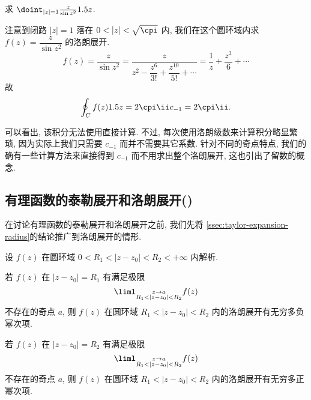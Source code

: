 \begin{example}
  求 $\doint_{|z|=1}\frac{z}{\sin z^2}\d z$.
\end{example}

\begin{solution}
  注意到闭路 $|z|=1$ 落在 $0<|z|<\sqrt \cpi$ 内, 我们在这个圆环域内求 $f(z)=\dfrac{z}{\sin z^2}$ 的洛朗展开.
  \[
     f(z)
    =\frac{z}{\sin z^2}
    =\frac{z}{z^2-\dfrac{z^6}{3!}+\dfrac{z^{10}}{5!}+\cdots}
    =\frac1z+\frac{z^3}6+\cdots
  \]
  故
  \[
    \oint_Cf(z)\d z=2\cpi\ii  c_{-1}=2\cpi\ii .
  \]
\end{solution}

可以看出, 该积分无法使用\thmCIH 直接计算.
不过, 每次使用洛朗级数来计算积分略显繁琐, 因为实际上我们只需要 $c_{-1}$ 而并不需要其它系数.
针对不同的奇点特点, 我们的确有一些计算方法来直接得到 $c_{-1}$ 而不用求出整个洛朗展开, 这也引出了留数的概念.


\subsection{有理函数的泰勒展开和洛朗展开(\optional)}
\label{ssec:rational-function-expansion}

在讨论有理函数的泰勒展开和洛朗展开之前, 我们先将 \ref{ssec:taylor-expansion-radius}的结论推广到洛朗展开的情形.

\begin{theorem}
  设 $f(z)$ 在圆环域 $0<R_1<|z-z_0|<R_2<+\infty$ 内解析.
  \begin{enumpar}
    \item 若 $f(z)$ 在 $|z-z_0|=R_1$ 有满足极限
    \[
      \liml_{\substack{z\ra a\\R_1<|z-z_0|<R_2}} f(z)
    \]
    不存在的奇点 $a$, 则 $f(z)$ 在圆环域 $R_1<|z-z_0|<R_2$ 内的洛朗展开有无穷多负幂次项.
    \label{enum:laurent-expansion-infinite-negative}
    \item 若 $f(z)$ 在 $|z-z_0|=R_2$ 有满足极限
    \[
      \liml_{\substack{z\ra a\\R_1<|z-z_0|<R_2}} f(z)
    \]
    不存在的奇点 $a$, 则 $f(z)$ 在圆环域 $R_1<|z-z_0|<R_2$ 内的洛朗展开有无穷多正幂次项.
  \end{enumpar}
\end{theorem}

